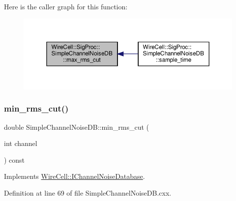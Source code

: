 Here is the caller graph for this function\+:
\nopagebreak
\begin{figure}[H]
\begin{center}
\leavevmode
\includegraphics[width=350pt]{class_wire_cell_1_1_sig_proc_1_1_simple_channel_noise_d_b_a22eaf2783321cb45cd904f97de2ba7d3_icgraph}
\end{center}
\end{figure}
\mbox{\label{class_wire_cell_1_1_sig_proc_1_1_simple_channel_noise_d_b_a8e8aa023834a47f96b0bdb69bc76e7a8}} 
\subsubsection{\texorpdfstring{min\+\_\+rms\+\_\+cut()}{min\_rms\_cut()}}
{\footnotesize\ttfamily double Simple\+Channel\+Noise\+D\+B\+::min\+\_\+rms\+\_\+cut (\begin{DoxyParamCaption}\item[{int}]{channel }\end{DoxyParamCaption}) const\hspace{0.3cm}{\ttfamily [virtual]}}



Implements \hyperlink{class_wire_cell_1_1_i_channel_noise_database_ad0e7e7c3424260af2bd426e578ad83f6}{Wire\+Cell\+::\+I\+Channel\+Noise\+Database}.



Definition at line 69 of file Simple\+Channel\+Noise\+D\+B.\+cxx.

